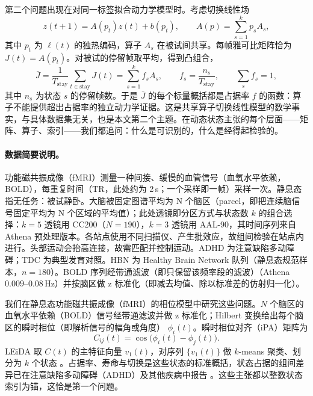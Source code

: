 \documentclass[11pt]{ctexart}
\theoremstyle{definition}
\begin{document}
第二个问题出现在对同一标签拟合动力学模型时。考虑切换线性场
\begin{equation}
z(t+1)=A(p_t)z(t)+b(p_t),
\qquad
A(p)=\sum_{s=1}^{k}p_sA_s,
\end{equation}
其中 $p_t$ 为 $\ell(t)$ 的独热编码，算子 $A_s$ 在被试间共享。每帧雅可比矩阵恰为 $J(t)=A(p_t)$。对被试的停留帧取平均，得到凸组合，
\begin{equation}
\bar J=\frac1{T_{\mathrm{stay}}}\sum_{t\in\mathrm{stay}}J(t)
=\sum_{s=1}^{k}f_sA_s,
\qquad
f_s=\frac{n_s}{T_{\mathrm{stay}}},
\qquad
\sum_s f_s=1,
\end{equation}
其中 $n_s$ 为状态 $s$ 的停留帧数。于是 $\bar J$ 的每个标量概括都是占据率 $f$ 的函数：算子不能提供超出占据率的独立动力学证据。这是共享算子切换线性模型的数学事实，与具体数据集无关，也是本文第二个主题。在动态状态主张的每个层面——矩阵、算子、索引——我们都追问：什么是可识别的，什么是经得起检验的。

\paragraph{数据简要说明。}功能磁共振成像（fMRI）测量一种间接、缓慢的血管信号（血氧水平依赖，BOLD），每重复时间（TR，此处约为 2\,s；一个采样即一帧）采样一次。静息态指无任务：被试静卧。大脑被固定图谱平均为 N 个脑区（parcel，即把连续脑信号固定平均为 N 个区域的平均值）；此处透镜即分区方式与状态数 $k$ 的组合选择：$k=5$ 透镜用 CC200（$N=190$），$k=3$ 透镜用 AAL-90，其时间序列来自 Athena 预处理版本。各站点使用不同扫描仪、产生批效应，故组间检验在站点内进行。头部运动会抬高连接，故需匹配并控制运动。ADHD 为注意缺陷多动障碍；TDC 为典型发育对照。HBN 为 Healthy Brain Network 队列（静息态规范样本，$n=180$）。BOLD 序列经带通滤波（即只保留该频率段的滤波）（Athena $0.009$--$0.08$\,Hz）并按脑区做 z 标准化（即减去均值、除以标准差的仿射归一化）。

我们在静息态功能磁共振成像（fMRI）的相位模型中研究这些问题。$N$ 个脑区的血氧水平依赖（BOLD）信号经带通滤波并做 z 标准化；Hilbert 变换给出每个脑区的瞬时相位（即解析信号的幅角或角度） $\phi_i(t)$。瞬时相位对齐（iPA）矩阵为
\begin{equation}
C_{ij}(t)=\cos\big(\phi_i(t)-\phi_j(t)\big).
\end{equation}
LEiDA 取 $C(t)$ 的主特征向量 $v_1(t)$，对序列 $\{v_1(t)\}$ 做 $k$-means 聚类、划分为 $k$ 个状态 \cite{Cabral2017,Glerean2012}。占据率、寿命与切换是这些状态的标准概括，状态占据的组间差异已在注意缺陷多动障碍（ADHD）及其他疾病中报告 \cite{deLacy2019,Shappell2021,Ahmadi2021,Kaboodvand2020}。这些主张都以整数状态索引为锚，这恰是第一个问题。
\end{document}
